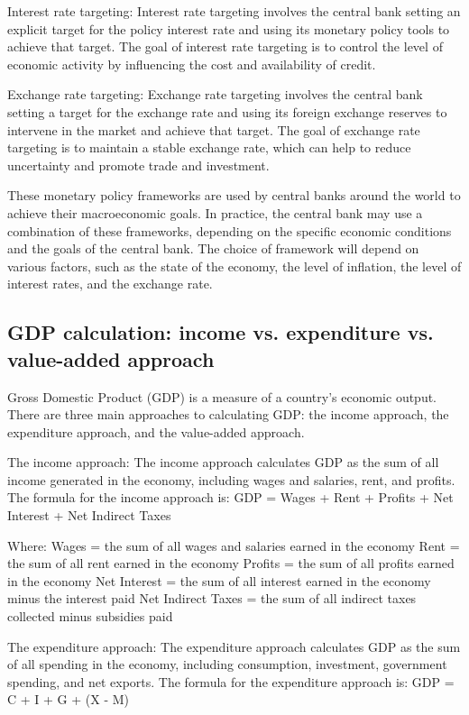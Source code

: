 \documentclass[12pt, a4paper, oneside]{article}
\begin{document}
Interest rate targeting: Interest rate targeting involves the central bank setting an explicit target for the policy interest rate and using its monetary policy tools to achieve that target. The goal of interest rate targeting is to control the level of economic activity by influencing the cost and availability of credit.

Exchange rate targeting: Exchange rate targeting involves the central bank setting a target for the exchange rate and using its foreign exchange reserves to intervene in the market and achieve that target. The goal of exchange rate targeting is to maintain a stable exchange rate, which can help to reduce uncertainty and promote trade and investment.

These monetary policy frameworks are used by central banks around the world to achieve their macroeconomic goals. In practice, the central bank may use a combination of these frameworks, depending on the specific economic conditions and the goals of the central bank. The choice of framework will depend on various factors, such as the state of the economy, the level of inflation, the level of interest rates, and the exchange rate.
\subsection{ GDP calculation: income vs. expenditure vs. value-added approach}  
Gross Domestic Product (GDP) is a measure of a country's economic output. There are three main approaches to calculating GDP: the income approach, the expenditure approach, and the value-added approach.

The income approach: The income approach calculates GDP as the sum of all income generated in the economy, including wages and salaries, rent, and profits. The formula for the income approach is:
GDP = Wages + Rent + Profits + Net Interest + Net Indirect Taxes

Where:
Wages = the sum of all wages and salaries earned in the economy
Rent = the sum of all rent earned in the economy
Profits = the sum of all profits earned in the economy
Net Interest = the sum of all interest earned in the economy minus the interest paid
Net Indirect Taxes = the sum of all indirect taxes collected minus subsidies paid

The expenditure approach: The expenditure approach calculates GDP as the sum of all spending in the economy, including consumption, investment, government spending, and net exports. The formula for the expenditure approach is:
GDP = C + I + G + (X - M)
\end{document}
